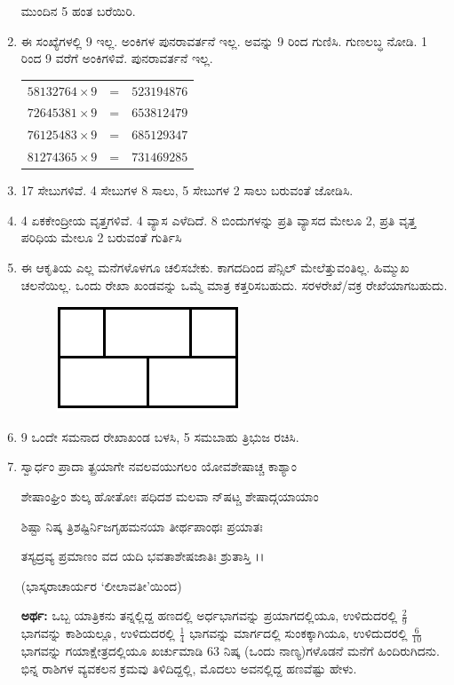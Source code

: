 \begin{enumerate}
\smallskip
ಮುಂದಿನ 5 ಹಂತ ಬರೆಯಿರಿ. 

\item ಈ ಸಂಖ್ಯೆಗಳಲ್ಲಿ 9 ಇಲ್ಲ. ಅಂಕಿಗಳ ಪುನರಾವರ್ತನೆ ಇಲ್ಲ. ಅವನ್ನು 9 ರಿಂದ ಗುಣಿಸಿ. ಗುಣಲಬ್ಧ ನೋಡಿ. 1 ರಿಂದ 9 ವರೆಗೆ ಅಂಕಿಗಳಿವೆ. ಪುನರಾವರ್ತನೆ ಇಲ್ಲ. 

\begin{tabular}[t]{lcl}
$58132764\times 9$ & = & $523194876$\\
$72645381\times 9$ & = & $653812479$\\
$76125483\times 9$ & = & $685129347$\\
$81274365\times 9$ & = & $731469285$
\end{tabular}

\item 17 ಸೇಬುಗಳಿವೆ. 4 ಸೇಬುಗಳ 8 ಸಾಲು, 5 ಸೇಬುಗಳ 2 ಸಾಲು ಬರುವಂತೆ ಜೋಡಿಸಿ. 

\item 4 ಏಕಕೇಂದ್ರೀಯ ವೃತ್ತಗಳಿವೆ. 4 ವ್ಯಾಸ ಎಳೆದಿದೆ. 8 ಬಿಂದುಗಳನ್ನು ಪ್ರತಿ ವ್ಯಾಸದ ಮೇಲೂ 2, ಪ್ರತಿ ವೃತ್ತ ಪರಿಧಿಯ ಮೇಲೂ 2 ಬರುವಂತೆ ಗುರ್ತಿಸಿ 

\item ಈ ಆಕೃತಿಯ ಎಲ್ಲ ಮನೆಗಳೊಳಗೂ ಚಲಿಸಬೇಕು. ಕಾಗದದಿಂದ ಪೆನ್ಸಿಲ್ ಮೇಲೆತ್ತುವಂತಿಲ್ಲ. ಹಿಮ್ಮುಖ ಚಲನೆಯಿಲ್ಲ. ಒಂದು ರೇಖಾ ಖಂಡವನ್ನು ಒಮ್ಮೆ ಮಾತ್ರ ಕತ್ತರಿಸಬಹುದು. ಸರಳರೇಖೆ/ವಕ್ರ ರೇಖೆಯಾಗಬಹುದು. 

\begin{figure}[H]
\centering
\includegraphics[scale=0.9]{images/chap7/q17.eps}
\end{figure}


\item 9 ಒಂದೇ ಸಮನಾದ ರೇಖಾಖಂಡ ಬಳಸಿ, 5 ಸಮಬಾಹು ತ್ರಿಭುಜ ರಚಿಸಿ. 

\item ಸ್ವಾರ್ಧಂ ಪ್ರಾದಾ ತ್ಪ್ರಯಾಗೇ ನವಲವಯುಗಲಂ ಯೋವಶೇಷಾಚ್ಚ ಕಾಶ್ಯಾಂ 

ಶೇಷಾಂಘ್ರಿಂ ಶುಲ್ಕ ಹೋತೋಃ ಪಧಿದಶ ಮಲವಾ ನ್‌ಷಟ್ಚ ಶೇಷಾದ್ಗಯಾಯಾಂ 

ಶಿಷ್ಟಾ ನಿಷ್ಕ ತ್ರಿಶಷ್ಟಿರ್ನಿಜಗೃಹಮನಯಾ ತೀರ್ಥಪಾಂಥಃ ಪ್ರಯಾತಃ 

ತಸ್ಯದ್ರವ್ಯ ಪ್ರಮಾಣಂ ವದ ಯದಿ ಭವತಾಶೇಷಜಾತಿಃ ಶ್ರುತಾಸ್ತಿ ।।

\smallskip
\hfill (ಭಾಸ್ಕರಾಚಾರ್ಯರ `ಲೀಲಾವತೀ'ಯಿಂದ)

\smallskip
{\bf ಅರ್ಥ:} ಒಬ್ಬ ಯಾತ್ರಿಕನು ತನ್ನಲ್ಲಿದ್ದ ಹಣದಲ್ಲಿ ಅರ್ಧಭಾಗವನ್ನು ಪ್ರಯಾಗದಲ್ಲಿಯೂ, ಉಳಿದುದರಲ್ಲಿ $\frac{2}{9}$ ಭಾಗವನ್ನು ಕಾಶಿಯಲ್ಲೂ, ಉಳಿದುದರಲ್ಲಿ $\frac{1}{4}$ ಭಾಗವನ್ನು ಮಾರ್ಗದಲ್ಲಿ ಸುಂಕಕ್ಕಾಗಿಯೂ, ಉಳಿದುದರಲ್ಲಿ $\frac{6}{10}$ ಭಾಗವನ್ನು ಗಯಾಕ್ಷೇತ್ರದಲ್ಲಿಯೂ ಖರ್ಚುಮಾಡಿ 63 ನಿಷ್ಕ (ಒಂದು ನಾಣ್ಯ)ಗಳೊಡನೆ ಮನೆಗೆ ಹಿಂದಿರುಗಿದನು. ಭಿನ್ನ ರಾಶಿಗಳ ವ್ಯವಕಲನ ಕ್ರಮವು ತಿಳಿದಿದ್ದಲ್ಲಿ, ಮೊದಲು ಅವನಲ್ಲಿದ್ದ ಹಣವೆಷ್ಟು ಹೇಳು.


\end{enumerate}
